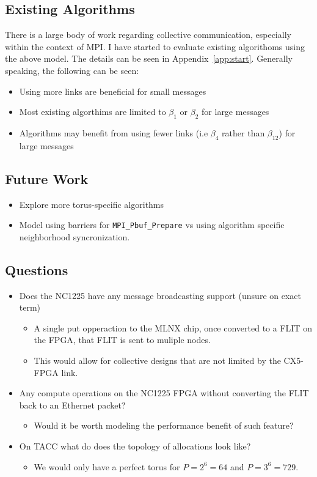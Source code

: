 \documentclass{article}
\begin{document}
  \subsection{Existing Algorithms}
  \label{sec:existing_algos}
  There is a large body of work regarding collective communication,
  especially within the context of MPI. I have started to evaluate existing algorithoms
  using the above model. The details can be seen in Appendix~\ref{app:start}.
  Generally speaking,
  the following can be seen:
  \begin{itemize}
    \item Using more links are beneficial for small messages
    \item Most existing algorthims are limited to $\beta_1$ or $\beta_2$ for large messages
    \item Algorithms may benefit from using fewer links (i.e $\beta_4$ rather than $\beta_{12}$) for large messages
  \end{itemize}

  \subsection{Future Work}
  \begin{itemize}
    \item Explore more torus-specific algorithms
    \item Model using barriers for \texttt{MPI\_Pbuf\_Prepare}
          vs using algorithm specific neighborhood syncronization.
  \end{itemize}

  \subsection{Questions}
  \begin{itemize}
    \item Does the NC1225 have any message broadcasting support (unsure on exact term)
    \begin{itemize}
      \item A single put opperaction to the MLNX chip,
            once converted to a FLIT on the FPGA,
            that FLIT is sent to muliple nodes.
      \item This would allow for collective designs that are not limited by the
            CX5-FPGA link.
    \end{itemize}
    \item Any compute operations on the NC1225 FPGA without converting the FLIT back to an Ethernet packet?
    \begin{itemize}
      \item Would it be worth modeling the performance benefit of such feature?
    \end{itemize}
    \item On TACC what do does the topology of allocations look like?
    \begin{itemize}
      \item We would only have a perfect torus for $P= 2^6 = 64 $ and $P = 3^6 = 729$.
    \end{itemize}
  \end{itemize}
\end{document}
